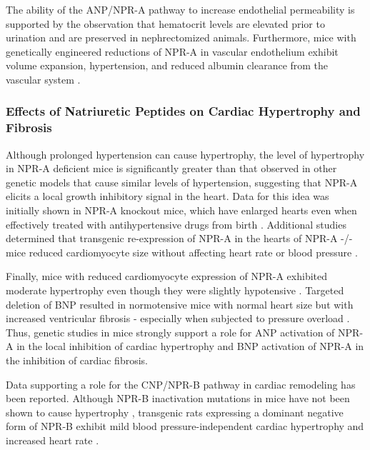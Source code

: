 \documentclass[14pt,a4paper,onecolumn]{extarticle}
\begin{document}
The ability of the ANP/NPR-A pathway to increase  endothelial permeability is supported by the observation that hematocrit levels are elevated prior to urination and are preserved in nephrectomized animals.  Furthermore, mice with genetically engineered reductions of NPR-A in vascular endothelium exhibit volume expansion, hypertension, and reduced albumin clearance from the vascular system \citep{Sabrane2005}.



\subsubsection{Effects of Natriuretic Peptides on Cardiac Hypertrophy and Fibrosis}



Although prolonged hypertension can cause hypertrophy, the level of hypertrophy in NPR-A deficient mice is significantly greater than that observed in other genetic models that cause similar levels of hypertension, suggesting that NPR-A elicits a local growth inhibitory signal in the heart. Data for this idea was initially shown in NPR-A knockout mice, which have enlarged hearts even when effectively treated with antihypertensive drugs from birth \citep{Knowles2001}. Additional studies determined that transgenic re-expression of NPR-A in the hearts of NPR-A -/- mice reduced cardiomyocyte size without affecting heart rate or blood pressure \citep{Kishimoto2001}.

Finally, mice with reduced cardiomyocyte expression of NPR-A exhibited moderate hypertrophy even though they were slightly hypotensive \citep{Holtwick2003} \citep{Patel2005}. Targeted deletion of BNP resulted in normotensive mice with normal heart size but with increased ventricular fibrosis - especially when subjected to pressure overload \citep{Tamura2000}. Thus, genetic studies in mice strongly support a role for ANP activation of NPR-A in the local inhibition of cardiac hypertrophy and BNP activation of NPR-A in the inhibition of cardiac fibrosis.



Data supporting a role for the CNP/NPR-B pathway in cardiac remodeling has been reported. Although NPR-B inactivation mutations in mice have not been shown to cause hypertrophy \citep{Tamura2004} \citep{Tsuji2005}, transgenic rats expressing a dominant negative form of NPR-B exhibit mild blood pressure-independent cardiac hypertrophy and increased heart rate \citep{Langenickel2006}.
\end{document}
